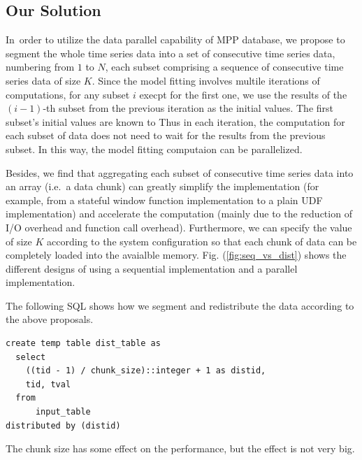\documentclass[english,10pt]{llncs}
\begin{document}
\subsection{Our Solution}


In\ order to utilize the data parallel capability of MPP database, we
propose to segment the whole time series data into a set of
consecutive time series data, numbering from $1$ to $N$, each subset
comprising a sequence of consecutive time series data of size
$K$. Since the model fitting involves multile iterations of
computations, for any subset $i$ execpt for the first one, we use the
results of the $(i-1)$-th subset from the previous iteration as the
initial values. The first subset's initial values are known to Thus in
each iteration, the computation for each subset of data does not need
to wait for the results from the previous subset. In this way, the
model fitting computaion can be parallelized. 

Besides, we find that aggregating each subset of consecutive time
series data into an array (i.e.\ a data chunk) can greatly simplify
the implementation (for example, from a stateful window function
implementation to a plain UDF implementation) and accelerate the
computation (mainly due to the reduction of I/O overhead and function
call overhead). Furthermore, we can specify the value of size $K$
according to the system configuration so that each chunk of data can
be completely loaded into the avaialble
memory. Fig. (\ref{fig:seq_vs_dist}) shows the different designs of
using a sequential implementation and a parallel implementation. 

The following SQL shows how we segment and redistribute the data
according to the above proposals.

\begin{verbatim}
create temp table dist_table as
  select
    ((tid - 1) / chunk_size)::integer + 1 as distid, 
    tid, tval
  from 
      input_table
distributed by (distid)
\end{verbatim}

The chunk size has some effect on the performance, but the effect is
not very big. 
\end{document}
